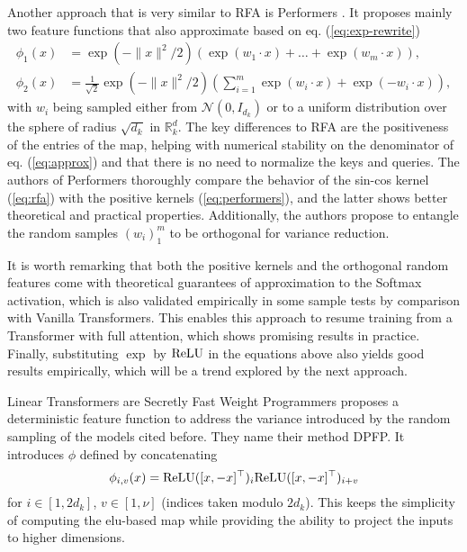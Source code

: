 Another approach that is very similar to RFA is Performers \cite{choromanski2022rethinking}. It proposes mainly two feature functions that also approximate based on eq. (\ref{eq:exp-rewrite})
\begin{equation}
\label{eq:performers}
    \begin{split}
        \phi_1(x)&= \exp(-\|x\|^2/2)(\exp(w_1 \cdot x) + \ldots + \exp(w_m \cdot x)), \\
        \phi_2(x)&= \frac{1}{\sqrt{2}}\exp(-\|x\|^2/2)(\sum_{i=1}^m \exp(w_i \cdot x) + \exp(-w_i \cdot x)),
    \end{split}
\end{equation} 
with $w_i$ being sampled either from $\mathcal{N}(0, I_{d_k})$ or to a uniform distribution over the sphere of radius $\sqrt{d_k}$ in $\mathbb{R}^d_k$. The key differences to RFA are the positiveness of the entries of the map, helping with numerical stability on the denominator of eq. (\ref{eq:approx}) and
that there is no need to normalize the keys and queries. The authors of Performers thoroughly compare the behavior of the sin-cos kernel (\ref{eq:rfa}) with the positive kernels (\ref{eq:performers}), and the latter shows better theoretical and practical properties. Additionally, the authors propose to entangle the random samples $(w_i)_1^m$ to be orthogonal for variance reduction. 

It is worth remarking that both the positive kernels and the orthogonal random features come with theoretical guarantees of approximation to the Softmax activation, which is also validated empirically in some sample tests by comparison with Vanilla Transformers. This enables this approach to resume training from a Transformer with full attention, which shows promising results in practice. Finally, substituting $\exp$ by $\text{ReLU}$ in the equations above also yields good results empirically, which will be a trend explored by the next approach.

\vspace{1em}

Linear Transformers are Secretly Fast Weight Programmers \cite{schlag2021linear} proposes a deterministic feature function to address the variance introduced by the random sampling of the models cited before. They name their method DPFP. It introduces $\phi$ defined by concatenating 
\begin{equation}
\label{eq:FWP}\phi_{i, v}(x) = \text{ReLU}([x, -x]^\top)_i \text{ReLU}([x, -x]^\top)_{i + v}
\end{equation} 
for $i \in [1, 2d_k]$, $v \in [1, \nu]$ (indices taken modulo $2d_k$). This keeps the simplicity of computing the elu-based map while providing the ability to project the inputs to higher dimensions.

